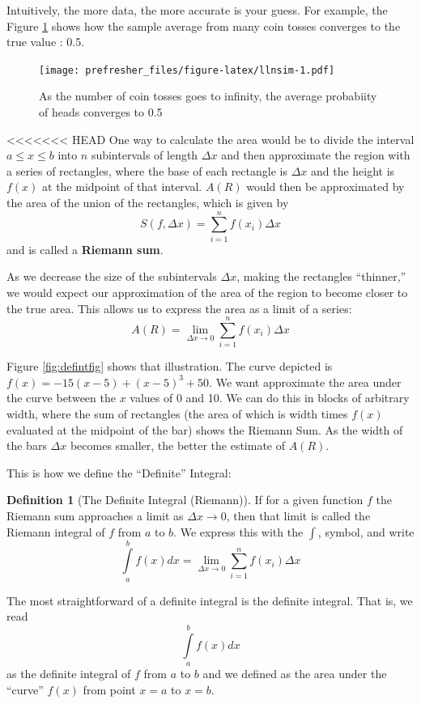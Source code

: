 \documentclass[]{book}
\theoremstyle{definition}
\newtheorem{definition}{Definition}[chapter]
\theoremstyle{definition}
\theoremstyle{definition}
\theoremstyle{remark}
\begin{document}
Intuitively, the more data, the more accurate is your guess. For example, the Figure \ref{fig:llnsim} shows how the sample average from many coin tosses converges to the true value : 0.5.

\begin{figure}
\centering
\texttt{[image: prefresher\_files/figure-latex/llnsim-1.pdf]}
\caption{\label{fig:llnsim}As the number of coin tosses goes to infinity, the average probabiity of heads converges to 0.5}
\end{figure}

<<<<<<< HEAD
One way to calculate the area would be to divide the interval \(a\le x\le b\) into \(n\) subintervals of length \(\Delta x\) and then approximate the region with a series of rectangles, where the base of each rectangle is \(\Delta x\) and the height is \(f(x)\) at the midpoint of that interval. \(A(R)\) would then be approximated by the area of the union of the rectangles, which is given by \[S(f,\Delta x)=\sum\limits_{i=1}^n f(x_i)\Delta x\] and is called a \textbf{Riemann sum}.

As we decrease the size of the subintervals \(\Delta x\), making the rectangles ``thinner,'' we would expect our approximation of the area of the region to become closer to the true area. This allows us to express the area as a limit of a series:
\[A(R)=\lim\limits_{\Delta x\to 0}\sum\limits_{i=1}^n f(x_i)\Delta x\]

Figure \ref{fig:defintfig} shows that illustration. The curve depicted is \(f(x) = -15(x - 5) + (x - 5)^3 + 50.\) We want approximate the area under the curve between the \(x\) values of 0 and 10. We can do this in blocks of arbitrary width, where the sum of rectangles (the area of which is width times \(f(x)\) evaluated at the midpoint of the bar) shows the Riemann Sum. As the width of the bars \(\Delta x\) becomes smaller, the better the estimate of \(A(R)\).

This is how we define the ``Definite'' Integral:

\begin{definition}[The Definite Integral (Riemann)]
\protect\hypertarget{def:unnamed-chunk-26}{}{\label{def:unnamed-chunk-26} {} }If for a given function \(f\) the Riemann sum approaches a limit as \(\Delta x \to 0\), then that limit is called the Riemann integral of \(f\) from \(a\) to \(b\). We express this with the \(\int\), symbol, and write \[\int\limits_a^b f(x) dx= \lim\limits_{\Delta x\to 0} \sum\limits_{i=1}^n f(x_i)\Delta x\]

The most straightforward of a definite integral is the definite integral. That is, we read
\[\int\limits_a^b f(x) dx\] as the definite integral of \(f\) from \(a\) to \(b\) and we defined as the area under the ``curve'' \(f(x)\) from point \(x=a\) to \(x=b\).
\end{definition}
\end{document}
